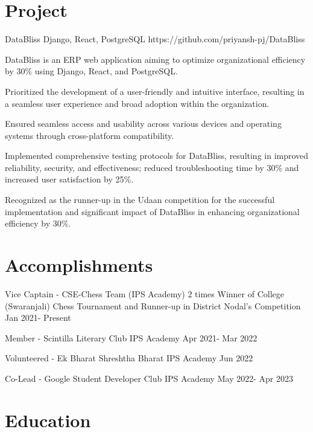 \documentclass[letterpaper]{config}
\begin{document}
\section{Project}
\Project
    {DataBliss} %
    {Django, React, PostgreSQL} %
    {https://github.com/priyansh-pj/DataBliss}%
    {
        \item DataBliss is an ERP web application aiming to optimize organizational efficiency by 30\% using Django, React, and PostgreSQL.
        \item Prioritized the development of a user-friendly and intuitive interface, resulting in a seamless user experience and broad adoption within the organization.
        \item Ensured seamless access and usability across various devices and operating systems through cross-platform compatibility.
        \item Implemented comprehensive testing protocols for DataBliss, resulting in improved reliability, security, and effectiveness; reduced troubleshooting time by 30\% and increased user satisfaction by 25\%.
        \item Recognized as the runner-up in the Udaan competition for the successful implementation and significant impact of DataBliss in enhancing organizational efficiency by 30\%.
    }


\section{Accomplishments}


\Responsibility
    {Vice Captain - CSE-Chess Team (IPS Academy)} %
    {2 times Winner of College (Swaranjali) Chess Tournament and Runner-up in District Nodal’s Competition} %
    {Jan 2021- Present} %

\Responsibility
    {Member - Scintilla Literary Club} %
    {IPS Academy} %
    {Apr 2021- Mar 2022} %

\Responsibility
    {Volunteered - Ek Bharat Shreshtha Bharat} %
    {IPS Academy} %
    {Jun 2022} %
    
\Responsibility
    {Co-Lead - Google Student Developer Club} %
    {IPS Academy} %
    {May 2022- Apr 2023} %

    
    
\section{Education}
\end{document}
